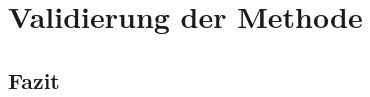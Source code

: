 \cleardoublepage
\chapter{Validierung der Methode}
\label{ch:Validerung}



\section{Fazit}
\label{sec:Fazit}

